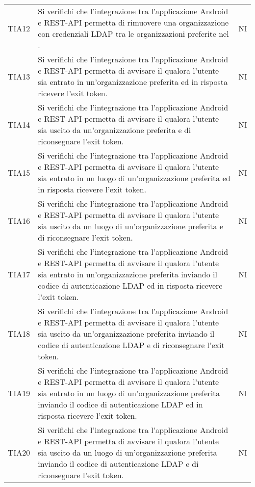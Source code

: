 {\begin{longtable}{ c C{13cm} C{1cm}}
TIA12 & Si verifichi che l’integrazione tra l’applicazione Android e REST-API permetta di rimuovere una organizzazione con credenziali LDAP tra le organizzazioni preferite nel . & NI \\
TIA13 & Si verifichi che l’integrazione tra l’applicazione Android e REST-API permetta di avvisare il  qualora l'utente sia entrato in un'organizzazione preferita ed in risposta ricevere l'exit token. & NI \\
TIA14 & Si verifichi che l’integrazione tra l’applicazione Android e REST-API permetta di avvisare il  qualora l'utente sia uscito da un'organizzazione preferita e di riconsegnare l'exit token. & NI \\
TIA15 & Si verifichi che l’integrazione tra l’applicazione Android e REST-API permetta di avvisare il  qualora l'utente sia entrato in un luogo di un'organizzazione preferita ed in risposta ricevere l'exit token. & NI \\
TIA16 & Si verifichi che l’integrazione tra l’applicazione Android e REST-API permetta di avvisare il  qualora l'utente sia uscito da un luogo di un'organizzazione preferita e di riconsegnare l'exit token. & NI \\
TIA17 & Si verifichi che l’integrazione tra l’applicazione Android e REST-API permetta di avvisare il  qualora l'utente sia entrato in un'organizzazione preferita inviando il codice di autenticazione LDAP ed in risposta ricevere l'exit token. & NI \\
TIA18 & Si verifichi che l’integrazione tra l’applicazione Android e REST-API permetta di avvisare il  qualora l'utente sia uscito da un'organizzazione preferita inviando il codice di autenticazione LDAP e di riconsegnare l'exit token. & NI \\
TIA19 & Si verifichi che l’integrazione tra l’applicazione Android e REST-API permetta di avvisare il  qualora l'utente sia entrato in un luogo di un'organizzazione preferita inviando il codice di autenticazione LDAP ed in risposta ricevere l'exit token. & NI \\
TIA20 & Si verifichi che l’integrazione tra l’applicazione Android e REST-API permetta di avvisare il  qualora l'utente sia uscito da un luogo di un'organizzazione preferita inviando il codice di autenticazione LDAP e di riconsegnare l'exit token. & NI \\


\end{longtable}}

